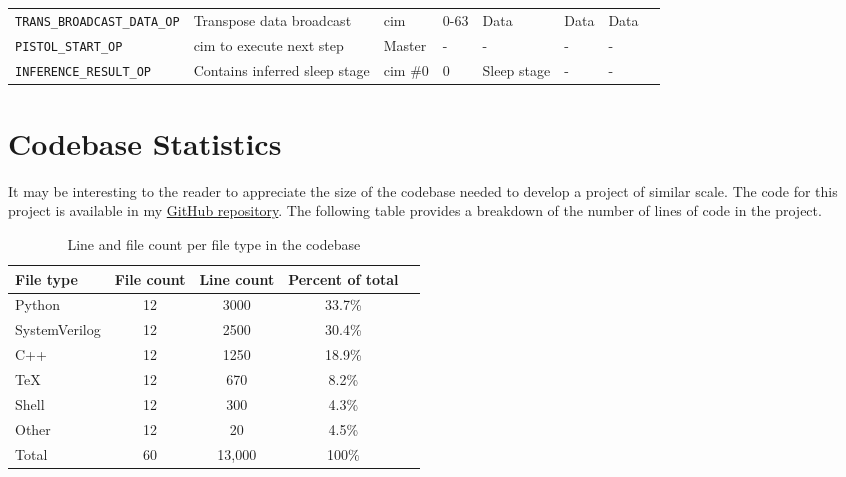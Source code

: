 \begin{sidewaystable}
\begin{tabular}{@{} p{6.5cm}lllllll @{}}
        \texttt{TRANS\_BROADCAST\_DATA\_OP}         & Transpose data broadcast          & \ac{cim}      & 0-63          & Data              & Data              & Data \\
        \texttt{PISTOL\_START\_OP}                  & \ac{cim} to execute next step     & Master        & -             & -                 & -                 & - \\
        \texttt{INFERENCE\_RESULT\_OP}              & Contains inferred sleep stage     & \ac{cim} \#0  & 0             & Sleep stage       & -                 & - \\
    \end{tabular}
    \label{tab:bus_ops}
\end{sidewaystable}

\section{Codebase Statistics}
It may be interesting to the reader to appreciate the size of the codebase needed to develop a project of similar scale. The code for this project is available 
in my \href{https://github.com/TristanRobitaille/engsci-thesis}{GitHub repository}. The following table provides a breakdown of the number of lines of code in the project.

\begin{table}[ht]
    \centering
    \renewcommand{\arraystretch}{1.2} %
    \setlength{\arrayrulewidth}{1.5pt} %
    \caption{Line and file count per file type in the codebase}
    \begin{tabular}{@{} p{4cm}cccr @{}}
        \toprule
        File type       & File count    & Line count    & Percent of total & \\\midrule
        Python          & 12            & 3000          & 33.7\% \\
        SystemVerilog   & 12            & 2500          & 30.4\% \\
        C++             & 12            & 1250          & 18.9\% \\
        TeX             & 12            & 670           & 8.2\%  \\
        Shell           & 12            & 300           & 4.3\%  \\
        Other           & 12            & 20            & 4.5\%  \\\midrule
        Total           & 60            & 13,000        & 100\%  \\
        \hline
    \end{tabular}
    \label{tab:line_cnt}
\end{table}

